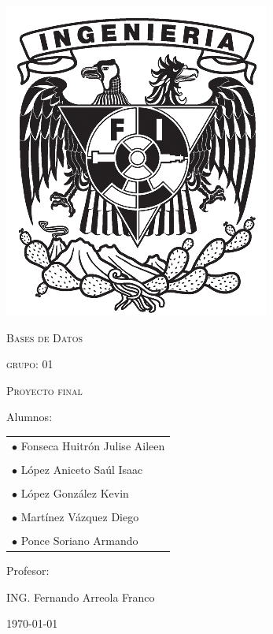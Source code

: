 \documentclass[12pt,letterpaper]{article}
\begin{document}
\begin{titlepage}
\begin{minipage}{0.14\linewidth}
			\includegraphics[width=\linewidth]{img/shieldFi}
		\end{minipage}
		
		\centering
		\vspace{1.5cm}
		{\scshape\Large Bases de Datos \par}
		{\scshape\Large grupo: 01\par}
		\vspace{3cm}
		{\scshape\Huge Proyecto final \par}
		\vspace{0.8cm}
		\vfill
		{\Large Alumnos: \par}
		\begin{center}
			\begin{tabular}{l}
				$\bullet$ {\Large Fonseca Huitrón Julise Aileen } \\
				\\
				$\bullet$ {\Large López Aniceto Saúl Isaac }\\
				\\
				$\bullet$ {\Large López González Kevin } \\
				\\
				$\bullet$ {\Large  Martínez Vázquez Diego}\\
				\\
				$\bullet$ {\Large Ponce Soriano Armando }\\
			\end{tabular}
		\end{center}
		\vfill
		{\Large Profesor: \par}
		{\Large ING. Fernando Arreola Franco \par}
		\vfill
		{\Large \today \par}
	\end{titlepage}
	
\end{document}
